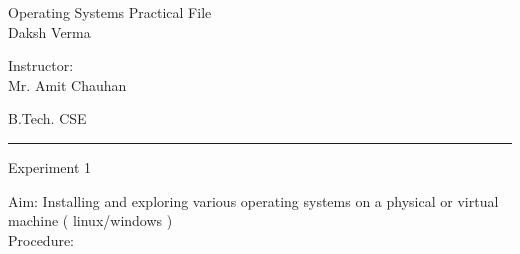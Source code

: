 \documentclass[12pt,letterpaper]{article}
\begin{document}
\begin{center}
  \Huge{Operating Systems Practical File}\\
  \vspace{0.25cm}
  \small{Daksh Verma}
\end{center}

\vspace{-1.75cm}

\begin{flushright}
  Instructor: \\ Mr. Amit Chauhan
\end{flushright}

\vspace{-1.3cm}

\begin{flushleft}
  B.Tech. CSE
\end{flushleft}

\rule{15.5cm}{0.1mm}%

\vspace{1cm}

\noindent
\Large {Experiment 1}\\
\vspace{1cm}

\noindent
Aim: Installing and exploring various operating systems on a physical or virtual machine ( linux/windows )\\
Procedure:\\  
\small 
\end{document}
